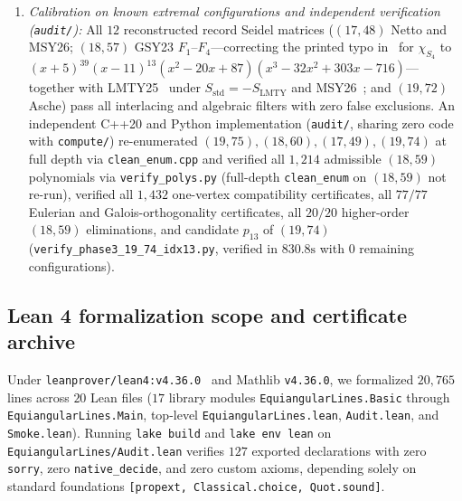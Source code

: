 \documentclass[11pt,reqno]{amsart}
\theoremstyle{definition}
\theoremstyle{remark}
\begin{document}
\begin{enumerate}
  \item \emph{Calibration on known extremal configurations and independent verification (\nolinkurl{audit/}):} All $12$ reconstructed record Seidel matrices ($(17,48)$ Netto and MSY26; $(18,57)$ GSY23 $F_1$--$F_4$---correcting the printed typo in~\cite[p.~1876]{GSY2023} for $\chi_{S_4}$ to $(x+5)^{39}(x-11)^{13}(x^2-20x+87)(x^3-32x^2+303x-716)$---together with LMTY25~\cite{LMTY2025} under $S_{\mathrm{std}} = -S_{\mathrm{LMTY}}$ and MSY26~\cite{MSY2026}; and $(19,72)$ Asche) pass all interlacing and algebraic filters with zero false exclusions. An independent C++20 and Python implementation (\nolinkurl{audit/}, sharing zero code with \nolinkurl{compute/}) re-enumerated $(19,75), (18,60), (17,49), (19,74)$ at full depth via \nolinkurl{clean_enum.cpp} and verified all $1{,}214$ admissible $(18,59)$ polynomials via \nolinkurl{verify_polys.py} (full-depth \nolinkurl{clean_enum} on $(18,59)$ not re-run), verified all $1{,}432$ one-vertex compatibility certificates, all $77/77$ Eulerian and Galois-orthogonality certificates, all $20/20$ higher-order $(18, 59)$ eliminations, and candidate $p_{13}$ of $(19, 74)$ (\nolinkurl{verify_phase3_19_74_idx13.py}, verified in $830.8\text{s}$ with $0$ remaining configurations).
\end{enumerate}

\subsection{Lean 4 formalization scope and certificate archive}
Under \nolinkurl{leanprover/lean4:v4.36.0}~\cite{MouraUllrich2021} and Mathlib \texttt{v4.36.0}, we formalized $20{,}765$ lines across $20$ Lean files ($17$ library modules \nolinkurl{EquiangularLines.Basic} through \nolinkurl{EquiangularLines.Main}, top-level \nolinkurl{EquiangularLines.lean}, \nolinkurl{Audit.lean}, and \nolinkurl{Smoke.lean}). Running \texttt{lake build} and \texttt{lake env lean} on \nolinkurl{EquiangularLines/Audit.lean} verifies $127$ exported declarations with zero \texttt{sorry}, zero \nolinkurl{native_decide}, and zero custom axioms, depending solely on standard foundations \texttt{[propext, Classical.choice, Quot.sound]}.
\end{document}
